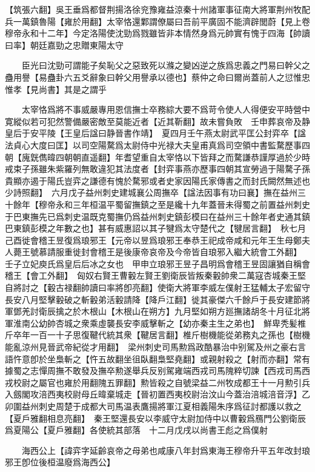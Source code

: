 【筑張六翻】吳王垂爲都督荆揚洛徐兖豫雍益涼秦十州諸軍事征南大將軍荆州牧配兵一萬鎮魯陽【雍於用翻】太宰恪還鄴謂僚屬曰吾前平廣固不能濟辟閭蔚【見上卷穆帝永和十二年】今定洛陽使沈勁爲戮雖皆非本情然身爲元帥實有愧于四海【帥讀曰率】朝廷嘉勁之忠贈東陽太守

　　臣光曰沈勁可謂能子矣恥父之惡致死以滌之變凶逆之族爲忠義之門易曰幹父之蠱用譽【易蠱卦六五爻辭象曰幹父用譽承以德也】蔡仲之命曰爾尚蓋前人之愆惟忠惟孝【見尚書】其是之謂乎

　　太宰恪爲將不事威嚴專用恩信撫士卒務綜大要不爲苛令使人人得便安平時營中寛縱似若可犯然警備嚴密敵至莫能近者【近其靳翻】故未嘗負敗　壬申葬哀帝及静皇后于安平陵【王皇后諡曰静晉書作靖】　夏四月壬午燕太尉武平匡公封弈卒【諡法貞心大度曰匡】以司空陽騖爲太尉侍中光禄大夫皇甫真爲司空領中書監騖歷事四朝【廆皝儁暐四朝朝直遥翻】年耆望重自太宰恪以下皆拜之而騖謙恭謹厚過於少時戒束子孫雖朱紫羅列無敢違犯其法度者【封弈事燕亦歷事四朝其宣勞過于陽騖子孫貴顯亦遏于陽氏豈弈之謙德有愧於騖邪或者史家因陽氏家傳書之而封氏闕然無述也少詩照翻】　六月戊子益州刺史建城襄公周撫卒【諡法因事有功曰襄】撫在益州三十餘年【穆帝永和三年桓温平蜀留撫鎮之至是纔十九年蓋晉未得蜀之前置益州刺史于巴東撫先已爲刺史温既克蜀撫仍爲益州刺史鎮彭模曰在益州三十餘年者史通其鎮巴東鎮彭模之年數之也】甚有威惠詔以其子犍爲太守楚代之【犍居言翻】　秋七月己酉徙會稽王昱復爲琅邪王【元帝以昱爲琅邪王奉恭王祀成帝咸和元年王生母鄭夫人薨王號慕請服重徙封會稽王是後康帝哀帝及今帝皆自琅邪入繼大統會工外翻】　壬子立妃庾氏爲皇后后冰之女也　甲申立琅邪王昱子昌明爲會稽王昱固讓猶自稱會稽王【會工外翻】　匈奴右賢王曹轂左賢王劉衛辰皆叛秦轂帥衆二萬寇杏城秦王堅自將討之【轂古禄翻帥讀曰率將卽亮翻】使衛大將軍李威左僕射王猛輔太子宏留守長安八月堅擊轂破之斬轂弟活轂請降【降戶江翻】徙其豪傑六千餘戶于長安建節將軍鄧羌討衛辰擒之於木根山【木根山在朔方】九月堅如朔方廵撫諸胡冬十月征北將軍淮南公幼帥杏城之衆乘虛襲長安李威擊斬之【幼亦秦主生之弟也】　鮮卑秃髪椎斤卒年一百一十子思復鞬代統其衆【鞬居言翻】椎斤樹機能從弟務丸之孫也【樹機能亂涼州見晉武帝紀從才用翻】　梁州刺史司馬勲爲政酷暴治中别駕及州之豪右言語忤意卽於坐梟斬之【忤五故翻坐徂臥翻梟堅堯翻】或親射殺之【射而亦翻】常有據蜀之志憚周撫不敢發及撫卒勲遂舉兵反别駕雍端西戎司馬隗粹切諫【西戎司馬西戎校尉之屬官也雍於用翻隗五罪翻】勲皆殺之自號梁益二州牧成都王十一月勲引兵入劔閣攻涪西夷校尉母丘暐棄城走【晉初置西夷校尉治汶山今蓋治涪城涪音浮】乙卯圍益州刺史周楚于成都大司馬温表鷹揚將軍江夏相義陽朱序爲征討都護以救之【夏戶雅翻相息亮翻】　秦王堅還長安以李威守太尉加侍中以曹轂爲鴈門公劉衛辰爲夏陽公【夏戶雅翻】各使統其部落　十二月戊戌以尚書王彪之爲僕射

　　海西公上【諱弈字延齡哀帝之母弟也咸康八年封爲東海王穆帝升平五年改封琅邪王卽位後桓温廢爲海西公】

